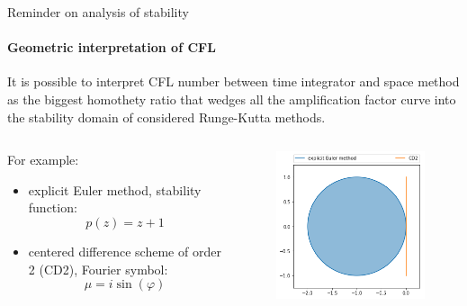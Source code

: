 \documentclass{beamer}
\begin{document}
\begin{frame}{Reminder on analysis of stability}
  \framesubtitle{Geometric interpretation of CFL}
  It is possible to interpret CFL number between time integrator and space method as the biggest homothety ratio that wedges all the amplification factor curve into the stability domain of considered Runge-Kutta methods.

  \begin{columns}
    \begin{column}{0.5\textwidth}
      For example:
      \begin{itemize}
        \item explicit Euler method, stability function:
          $$
            p(z) = z+1
          $$
        \item centered difference scheme of order 2 (CD2), Fourier symbol:
          $$
            \mu = i\sin(\varphi)
          $$
      \end{itemize}
    \end{column}
    \begin{column}{0.5\textwidth}
      \begin{figure}\centering
      \includegraphics[width=\textwidth]{img/cfl_example.png}
      \end{figure}
    \end{column}
  \end{columns}
\end{frame}
\end{document}
